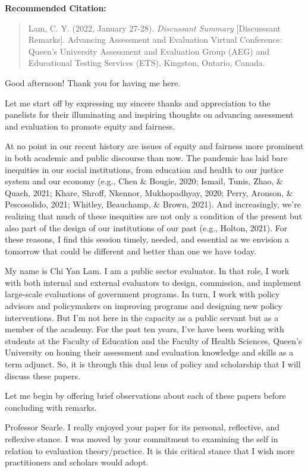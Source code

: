 \documentclass[
]{book}
\begin{document}
\textbf{Recommended Citation:}

\begin{quote}
Lam, C. Y. (2022, January 27-28). \emph{Discussant Summary} {[}Discusssant Remarks{]}. Advancing Assessment and Evaluation Virtual Conference: Queen's University Assessment and Evaluation Group (AEG) and Educational Testing Services (ETS), Kingston, Ontario, Canada.
\end{quote}

Good afternoon! Thank you for having me here.

Let me start off by expressing my sincere thanks and appreciation to the panelists for their illuminating and inspiring thoughts on advancing assessment and evaluation to promote equity and fairness.

At no point in our recent history are issues of equity and fairness more prominent in both academic and public discourse than now. The pandemic has laid bare inequities in our social institutions, from education and health to our justice system and our economy (e.g., Chen \& Bougie, 2020; Ismail, Tunis, Zhao, \& Quach, 2021; Khare, Shroff, Nkennor, Mukhopadhyay, 2020; Perry, Aronson, \& Pescosolido, 2021; Whitley, Beauchamp, \& Brown, 2021). And increasingly, we're realizing that much of these inequities are not only a condition of the present but also part of the design of our institutions of our past (e.g., Holton, 2021). For these reasons, I find this session timely, needed, and essential as we envision a tomorrow that could be different and better than one we have today.

My name is Chi Yan Lam. I am a public sector evaluator. In that role, I work with both internal and external evaluators to design, commission, and implement large-scale evaluations of government programs. In turn, I work with policy advisors and policymakers on improving programs and designing new policy interventions. But I'm not here in the capacity as a public servant but as a member of the academy. For the past ten years, I've have been working with students at the Faculty of Education and the Faculty of Health Sciences, Queen's University on honing their assessment and evaluation knowledge and skills as a term adjunct. So, it is through this dual lens of policy and scholarship that I will discuss these papers.

Let me begin by offering brief observations about each of these papers before concluding with remarks.

Professor Searle. I really enjoyed your paper for its personal, reflective, and reflexive stance. I was moved by your commitment to examining the self in relation to evaluation theory/practice. It is this critical stance that I wish more practitioners and scholars would adopt.
\end{document}
